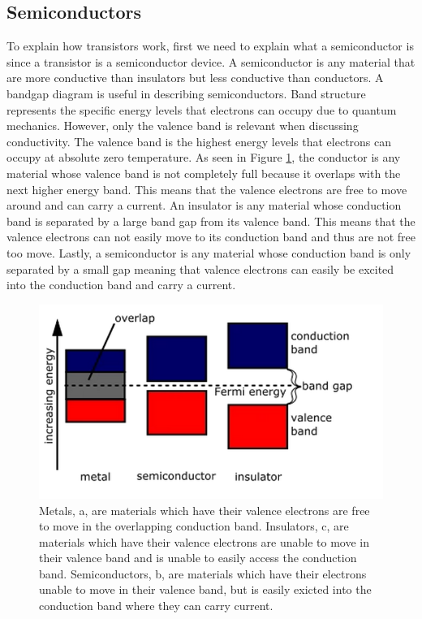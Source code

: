 \documentclass[ notitlepage, numerical, 11pt]{revtex4-1} %
\begin{document}
\subsection{Semiconductors}
To explain how transistors work, first we need to explain what a semiconductor is since a transistor is a semiconductor device. A semiconductor is any material that are more conductive than insulators but less conductive than conductors.  A bandgap diagram is useful in describing semiconductors. Band structure represents the specific energy levels that electrons can occupy due to quantum mechanics. However, only the valence band is relevant when discussing conductivity. The valence band is the highest energy levels that electrons can occupy at absolute zero temperature. As seen in Figure \ref{bandGap}, the conductor is any material whose valence band is not completely full because it overlaps with the next higher energy band. This means that the valence electrons are free to move around and can carry a current. An insulator is any material whose conduction band is separated by a large band gap from its valence band. This means that the valence electrons can not easily move to its conduction band and thus are not free too move. Lastly, a semiconductor is any material whose conduction band is only separated by a small gap meaning that valence electrons can easily be excited into the conduction band and carry a current.


\begin{figure}[H]
\centerline{\includegraphics[scale=.45]{bandGap.png}}
\caption{Metals, a, are materials which have their valence electrons are free to move in the overlapping conduction band. Insulators, c, are materials which have their valence electrons are unable to move in their valence band and is unable to easily access the conduction band. Semiconductors, b, are materials which have their electrons unable to move in their valence band, but is easily exicted into the conduction band where they can carry current.}
\label{bandGap}
\end{figure}
\end{document}
